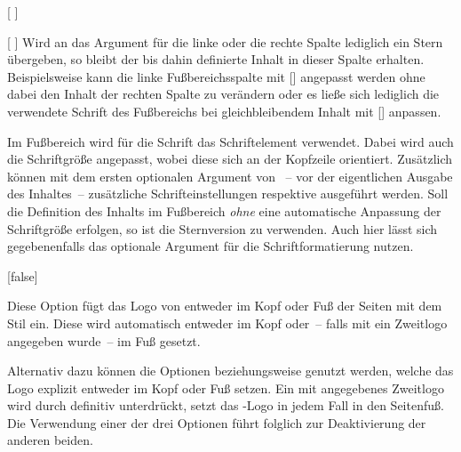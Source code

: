 \begin{Declaration*}{}
\begin{Declaration*}{}
\begin{Declaration*}{}
\begin{Declaration}{%
  [%
  ]%
}
\begin{Declaration}[v2.04]{%
  [%
  ]%
}
Wird an das Argument für die linke oder die rechte Spalte lediglich ein Stern 
\PValue{*} übergeben, so bleibt der bis dahin definierte Inhalt in dieser 
Spalte erhalten. Beispielsweise kann die linke Fußbereichsspalte mit 
[\POParameter{*}] angepasst werden ohne 
dabei den Inhalt der rechten Spalte zu verändern oder es ließe sich lediglich 
die verwendete Schrift des Fußbereichs bei gleichbleibendem Inhalt mit 
[\PParameter{*}\POParameter{*}]%
anpassen.

Im Fußbereich wird für die Schrift das Schriftelement  
verwendet. Dabei wird auch die Schriftgröße angepasst, wobei diese sich an der 
Kopfzeile orientiert. Zusätzlich können mit dem ersten optionalen Argument von 
~-- vor der eigentlichen Ausgabe des Inhaltes~-- zusätzliche 
Schrifteinstellungen respektive  ausgeführt werden. Soll die 
Definition des Inhalts im Fußbereich \emph{ohne} eine automatische Anpassung 
der Schriftgröße erfolgen, so ist die Sternversion  zu 
verwenden. Auch hier lässt sich gegebenenfalls das optionale Argument für die 
Schriftformatierung nutzen.
\end{Declaration}
\end{Declaration}

\begin{Declaration}[%
  v2.02:Logo von \DDC automatisch in Kopf/Fuß;%
  v2.02!\Option{ddc=colorblack};
  v2.02!\Option{ddc=gray};
  v2.02!\Option{ddc=black};
  v2.02!\Option{ddc=blue};
  v2.02!\Option{ddc=white};
]{}[false]
\begin{Declaration}[v2.02]{}
\begin{Declaration}[v2.02]{}
\printdeclarationlist%
%
%
%
%
%
Diese Option fügt das Logo von \DDC entweder im Kopf oder Fuß der Seiten mit 
dem Stil  ein. Diese wird automatisch entweder im Kopf 
oder~-- falls mit  ein Zweitlogo angegeben wurde~-- im Fuß 
gesetzt.

Alternativ dazu können die Optionen  beziehungsweise 
 genutzt werden, welche das Logo explizit entweder im Kopf oder 
Fuß setzen. Ein mit  angegebenes Zweitlogo wird durch 
 definitiv unterdrückt,  setzt das 
\DDC-Logo in jedem Fall in den Seitenfuß. Die Verwendung einer der drei 
Optionen führt folglich zur Deaktivierung der anderen beiden.


\end{Declaration}
\end{Declaration}
\end{Declaration}
\end{Declaration*}
\end{Declaration*}
\end{Declaration*}
